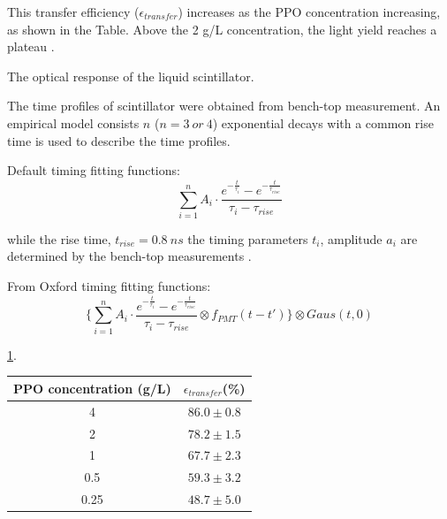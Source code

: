 
This transfer efficiency ($\mathcal{\epsilon}_{transfer}$) increases as the PPO concentration increasing, as shown in the Table. Above the 2 g/L concentration, the light yield reaches a plateau
\cite{scintillatorPaper}.


The optical response of the liquid scintillator.

The time profiles of scintillator were obtained from bench-top measurement. 
An empirical model consists $n$ ($n=3~or~4$) exponential decays  with a common rise time is used to describe the time profiles\cite{biller2020slow}.

Default timing fitting functions:
\[\sum^{n}_{i=1}A_i\cdot\frac{e^{-\frac{t}{\tau_i}}-e^{-\frac{t}{\tau_{rise}}}}{\tau_i-\tau_{rise}}
\]

while the rise time, $t_{rise} = 0.8~ns$ the timing parameters $t_i$,
amplitude $a_i$ are determined by the bench-top measurements \cite{chicagoTiming}.


From Oxford timing fitting functions: 
\[
\{\sum^{n}_{i=1}A_i\cdot\frac{e^{-\frac{t}{\tau_i}}-e^{-\frac{t}{\tau_{rise}}}}{\tau_i-\tau_{rise}}\otimes f_{PMT}(t-t')\}\otimes Gaus(t,0)
\]

\ref{transfer_efficiency}\cite{scintillatorPaper}. 
\begin{table}[ht]
	\centering
	\begin{tabular}{cc}
		\toprule
		PPO concentration (g/L) & $\mathcal{\epsilon}_{transfer}$(\%)	\\
		\midrule
		4   & $86.0\pm 0.8$\\
		2  & $78.2\pm 1.5$\\
		1  & $67.7\pm 2.3$\\
		0.5 & $59.3\pm 3.2$\\
		0.25 & $48.7\pm 5.0$\\
		\bottomrule
	\end{tabular}
	\label{transfer_efficiency}
\end{table}


